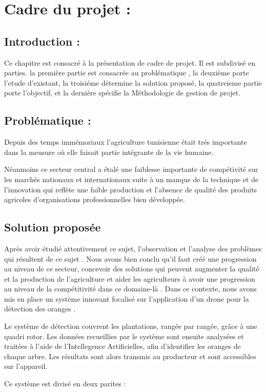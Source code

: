 
	\chapter{Cadre du projet :}
	\newpage
	
	
	\section{Introduction :}
	Ce chapitre est consacré à la présentation de cadre de projet. Il est subdivisé en  parties.
	la première partie est consacrée au problématique , la deuxième
	porte l'etude d'existant, la troisiéme détermine la  solution proposé, la quatreieme partie porte l’objectif, et la dernière spécifie la Méthodologie de gestion de projet.
	\section{Problématique :}
	Depuis des temps immémoriaux l'agriculture tunisienne était trés importante dans la meusure où elle faisait partie intégrante de la vie humaine.
	
	
	Néanmoins ce secteur central a étalé une faiblesse importante de compétivité sur les marchés nationaux et internationaux suite à un manque de la technique et de l'innovation qui reflète une faible production et l'absence de qualité des produits agricoles d'organisations professionnelles bien développée.
	\section{Solution proposée }
	Après avoir étudié attentivement ce sujet, l'observation et l'analyse des problèmes qui résultent de ce sujet . Nous avons bien conclu qu'il faut créé une progression au niveau de ce secteur, concevoir des solutions qui peuvent augmenter la qualité et la production de l'agriculture et aider les agriculteurs à avoir une progression au niveau de la compétitivité dans ce domaine-là . Dans ce contexte, nous avons mis en place un système innovant focalisé sur l'application d'un drone pour la détection des oranges .


	Le système de détection couvrent les plantations, rangée par rangée, grâce à une quadri rotor. Les données recueillies par le système sont ensuite analysées et traitées à l’aide de l’Intellegence Artificielles, afin d’identifier les oranges de chaque arbre. Les résultats sont alors transmis au producteur et sont accessibles sur l'appareil.


	Ce système est divisé en deux parites :



